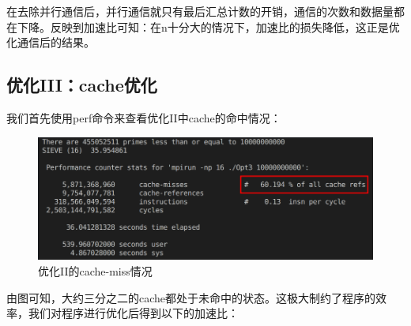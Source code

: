 \documentclass[a4paper,11pt,UTF8]{ctexart}
\begin{document}
在去除并行通信后，并行通信就只有最后汇总计数的开销，通信的次数和数据量都在下降。反映到加速比可知：在n十分大的情况下，加速比的损失降低，这正是优化通信后的结果。
\newpage
\subsection{优化III：cache优化}

我们首先使用perf命令来查看优化II中cache的命中情况：
\begin {figure}[h]
\centering %
\includegraphics[width=\textwidth]{5031-041411.png}
\caption{优化II的cache-miss情况} %
\label{five}
\end {figure}

由图可知，大约三分之二的cache都处于未命中的状态。这极大制约了程序的效率，我们对程序进行优化后得到以下的加速比：
\end{document}
